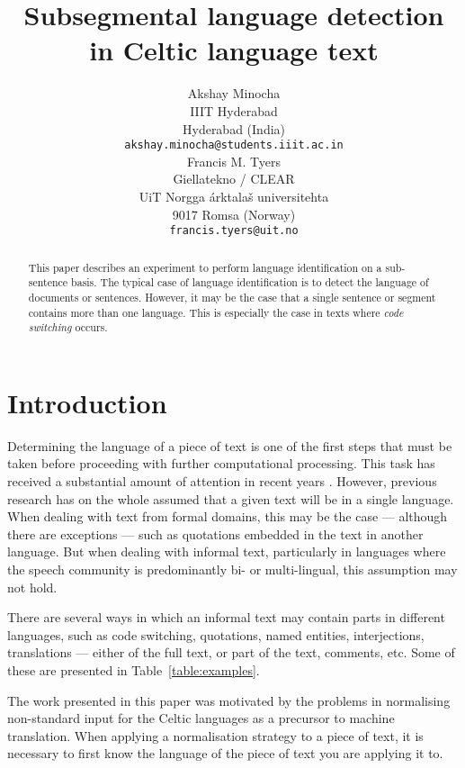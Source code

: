 \documentclass[11pt]{article}
\title{Subsegmental language detection in Celtic language text}
\author{}
\author{Akshay Minocha \\
  IIIT Hyderabad  \\
  Hyderabad (India) \\
  {\small {\tt akshay.minocha@students.iiit.ac.in}} \\\And
  Francis M. Tyers \\
  Giellatekno / CLEAR \\
  UiT Norgga \'arktala\v{s} universitehta  \\
  9017 Romsa (Norway) \\
  {\small {\tt francis.tyers@uit.no}} \\}
\date{}
\begin{document}
\maketitle
\begin{abstract}
  This paper describes an experiment to perform language identification on a sub-sentence basis. The typical
  case of language identification is to detect the language of documents or sentences. However, it may be the 
  case that a single sentence or segment contains more than one language. This is especially the case in texts
  where \emph{code switching} occurs. 

\end{abstract}

\section{Introduction}
\label{intro}
\vspace{-0.1cm}
Determining the language of a piece of text is one of the first steps that must be taken
before proceeding with further computational processing. This task has received a substantial amount of
attention in recent years \cite{cavnar1994n,lui2012langid}. However, previous research has on the whole assumed
that a given text will be in a single language. When dealing with text from formal domains,
this may be the case --- although there are exceptions --- such as quotations embedded in
the text in another language. But when dealing with informal text, particularly in languages
where the speech community is predominantly bi- or multi-lingual, this assumption may not hold.

There are several ways in which an informal text may contain parts in different languages, such as
code switching, quotations, named entities, interjections, translations --- either of the full text, or 
part of the text, comments, etc. Some of these are presented in Table~\ref{table:examples}.

The work presented in this paper was motivated by the problems in normalising non-standard input
for the Celtic languages as a precursor to machine translation. When applying a normalisation 
strategy to a piece of text, it is necessary to first know the language of the piece of text you 
are applying it to.
\end{document}

